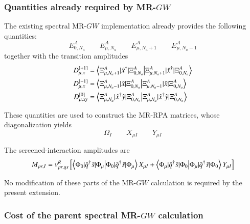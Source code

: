 \documentclass[aip,jcp,reprint,noshowkeys,superscriptaddress]{revtex4-1}
\begin{document}
\subsubsection{Quantities already required by MR-$GW$}

The existing spectral MR-$GW$ implementation already provides the
following quantities:
\begin{equation}
  E_{0,N_a}^A
  \qquad
  E_{\mu,N_a}^A
  \qquad
  E_{\mu,N_a+1}^A
  \qquad
  E_{\mu,N_a-1}^A
\end{equation}
together with the transition amplitudes
\begin{subequations}
  \begin{align}
    D_{\mu,x}^{[+1]}
    &=
    \braket{
      \Xi_{\mu,N_a+1}^A
      |
      \hat x^\dagger
      |
      \Xi_{0,N_a}^A
    }
    \\
    D_{\mu,x}^{[-1]}
    &=
    \braket{
      \Xi_{\mu,N_a-1}^A
      |
      \hat x
      |
      \Xi_{0,N_a}^A
    }
    \\
    D_{\mu,xy}^{[0]}
    &=
    \braket{
      \Xi_{\mu,N_a}^A
      |
      \hat x^\dagger\hat y
      |
      \Xi_{0,N_a}^A
    }
  \end{align}
\end{subequations}

These quantities are used to construct the MR-RPA matrices, whose
diagonalization yields
\begin{equation}
  \Omega_I
  \qquad
  X_{\mu I}
  \qquad
  Y_{\mu I}
\end{equation}

The screened-interaction amplitudes are
\begin{equation}
  M_{pr,I}
  =
  v^R_{pr,qs}
  \left[
    \braket{
      \Phi_0
      |
      \hat q^\dagger\hat s
      |
      \Phi_\mu
    }
    X_{\mu I}
    +
    \braket{
      \Phi_\mu
      |
      \hat q^\dagger\hat s
      |
      \Phi_0
    }
    Y_{\mu I}
  \right]
  \label{eq:M-implementation}
\end{equation}

No modification of these parts of the MR-$GW$ calculation is required
by the present extension.


\subsubsection{Cost of the parent spectral MR-$GW$ calculation}
\end{document}
